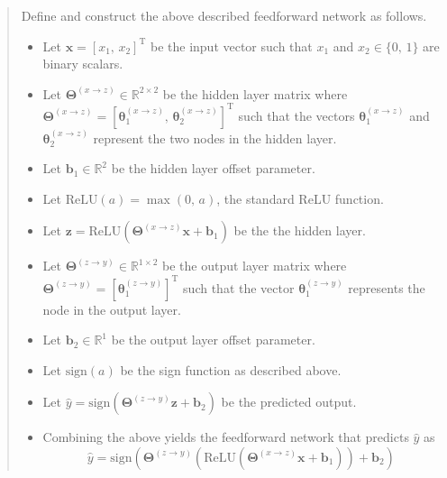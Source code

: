 \begin{quote}
    Define and construct the above described feedforward network as follows.
    \begin{itemize}
	\item Let $\textbf{x} = \left[ x_1, \, x_2 \right]^{\text{T}}$ be the input vector such that $x_1$ and $x_2 \in \{ 0, \, 1 \}$ are binary scalars.
	\item Let $\mathbf{\Theta}^{\left( x \rightarrow z \right)} \in \mathbb{R}^{2 \times 2}$ be the hidden layer matrix where $\mathbf{\Theta}^{\left( x \rightarrow z \right)} = \left[ \mathbf{\theta}_1^{\left( x \rightarrow z \right)} , \, \mathbf{\theta}_2^{\left( x \rightarrow z \right)} \right]^{\text{T}}$ such that the vectors $\mathbf{\theta}_1^{\left( x \rightarrow z \right)}$ and $\mathbf{\theta}_2^{\left( x \rightarrow z \right)}$ represent the two nodes in the hidden layer.
	\item Let $\mathbf{b}_1 \in \mathbb{R}^2$ be the hidden layer offset parameter.
	\item Let $\text{ReLU}\left( a \right) = \max(0, \, a)$, the standard ReLU function.  
	\item Let $\textbf{z} = \text{ReLU} \left( \mathbf{\Theta}^{\left( x \rightarrow z \right)} \textbf{x} + \mathbf{b}_1 \right)$ be the the hidden layer. 
	\item Let $\mathbf{\Theta}^{ \left( z \rightarrow y \right) } \in \mathbb{R}^{1 \times 2}$ be the output layer matrix where $\mathbf{\Theta}^{\left( z \rightarrow y \right)} = \left[ \mathbf{\theta}_1^{\left( z \rightarrow y \right)} \right]^{\text{T}}$ such that the vector $\mathbf{\theta}_1^{\left( z \rightarrow y \right)}$ represents the node in the output layer.
	\item Let $\mathbf{b}_2 \in \mathbb{R}^1$ be the output layer offset parameter.
	\item Let $\text{sign}(a)$ be the sign function as described above.
	\item Let $\hat{y} = \text{sign} \left( \mathbf{\Theta}^{ \left( z \rightarrow y \right) } \textbf{z} + \mathbf{b}_2 \right)$ be the predicted output.
	\item Combining the above yields the feedforward network that predicts $\hat{y}$ as $$ \boxed{ \hat{y} = \text{sign} \left( \mathbf{\Theta}^{ \left( z \rightarrow y \right) } \left( \text{ReLU} \left( \mathbf{\Theta}^{\left( x \rightarrow z \right)} \textbf{x} + \mathbf{b}_1 \right) \right) + \mathbf{b}_2 \right) }$$
    \end{itemize}
\end{quote}
